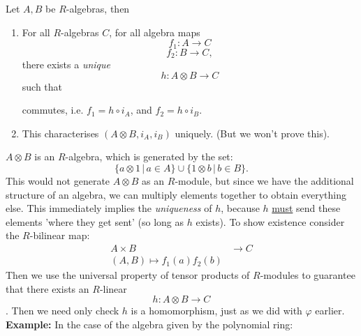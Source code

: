 \documentclass{article}
\begin{document}
\begin{fancyprop}
    Let $A,B$ be $R$-algebras, then
    \begin{enumerate}
        \item For all $R$-algebras $C$, for all algebra maps \[ f_{1}:A \to C\] \[f_{2}: B \to C, \] there exists a \textit{unique} \[ h : A \otimes B \to C \] such that \begin{center}
        \end{center}
        commutes, i.e. $f_{1} = h \circ i_{A}$, and $f_2 = h \circ i_B$.
        \item This characterises $(A \otimes B, i_A, i_B)$ uniquely. (But we won't prove this).
    \end{enumerate}
\end{fancyprop}
\proof $A \otimes B$ is an $R$-algebra, which is generated by the set: \[ \{ a \otimes 1 \, | \, a \in A \} \cup \{ 1 \otimes b \, | \, b \in B\}.\] This would not generate $A \otimes B$ as an $R$-module, but since we have the additional structure of an algebra, we can multiply elements together to obtain everything else. This immediately implies the \textit{uniqueness} of $h$, because $h$ \underline{must} send these elements 'where they get sent' (so long as $h$ exists).\gap
To show existence consider the $R$-bilinear map: \begin{align*}
    A \times B &\to C\\
    (A,B) \mapsto f_{1}(a)f_{2}(b)
\end{align*}
Then we use the universal property of tensor products of $R$-modules to guarantee that there exists an $R$-linear \[ h: A \otimes B \to C \]. Then we need only check $h$ is a homomorphism, just as we did with $\varphi$ earlier. \endproof \textbf{Example:} In the case of the algebra given by the polynomial ring: 
\begin{center}
\end{center}
\end{document}
